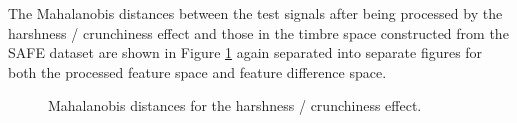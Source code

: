 			The Mahalanobis distances between the test signals after being processed by the harshness /
			crunchiness effect and those in the timbre space constructed from the SAFE dataset are shown in
			Figure \ref{fig:CrunchJeffs} again separated into separate figures for both the processed feature
			space and feature difference space.

			\begin{figure}[h!]
				\centering
				\quad
				\caption{Mahalanobis distances for the harshness / crunchiness effect.}
				\label{fig:CrunchJeffs}
			\end{figure}

